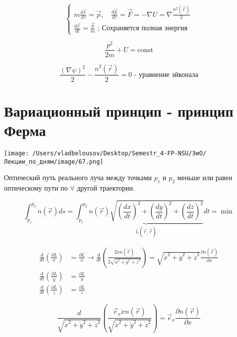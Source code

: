 \documentclass[12pt, a4paper]{report}
\begin{document}
\[ \begin{cases}
    \displaystyle m \frac{d \vec{r } }{d \tau }  = \vec{ p } , \quad  \frac{ d \vec{ p } }{d \tau } =\vec{F } = - \nabla U = \nabla \frac{ n ^2 (\vec{r } )}{2 }  \\
    \displaystyle \frac{ d \vec{r } }{dt } = \frac{ \vec{p } }{m } \text{ ; Сохраняется полная энергия}   
\end{cases} \] 

\[ \frac{ p ^2 }{ 2 m } + U = \mathrm{const}    \]

\[ \frac{(\nabla \psi ) ^2 }{2 } -\frac{ n ^2 (\vec{r } )}{2 } =0 \text{ - уравнение эйконала}   \] 

\section{Вариационный принцип - принцип Ферма} 

\begin{center}
    \texttt{[image: /Users/vladbelousov/Desktop/Semestr\_4-FP-NSU/ЭиО/Лекции\_по\_дням/image/67.png]}
\end{center}

Оптический путь реального луча между точками \( p_1  \) и \( p_2  \) меньше или равен оптическому пути по \( \forall     \) другой траектории.

\[ \int_{ p_1 }^{p_2 } n (\vec{r } )d s = \int_{ p_1 }^{ p_2} \underbrace{ n (\vec{r } ) \sqrt{ \left( \frac{dx}{dt }     \right) ^2 + \left( \frac{dy}{dt }     \right) ^2  +\left( \frac{dz}{dt }     \right) ^2  }}_{\mathbb{L}(\vec{r }  ,\dot{ \vec{r}}  )} dt = \min  \] 

\[ \begin{aligned}
    \frac{d }{dt } \left(  \frac{\partial  L }{\dot{x } }  \right) &=   \frac{\partial  L }{x}  \to \frac{d}{dt } \left(  \frac{ 2 \dot{ x }  n (\vec{r } )}{ 2 \sqrt{\dot{ x } ^2 + \dot{ y } ^2 + \dot{ z } ^2 } }   \right) = \sqrt{\dot{ x } ^2 + \dot{ y } ^2 + \dot{ z } ^2}  \frac{\partial  n ( \vec{r } )}{\partial  x} \\ 
    \frac{d }{dt } \left(  \frac{\partial  L }{\dot{y } }  \right) &=  \frac{\partial  L }{y} \\
    \frac{d }{dt } \left(  \frac{\partial  L }{\dot{z } }  \right) &=   \frac{\partial  L }{z} 
\end{aligned} \] 

\[     \frac{d}{\sqrt{\dot{ x } ^2 + \dot{ y } ^2 + \dot{ z } ^2 }} \left(  \frac{\vec{e } _x \dot{ x }  n(\vec{r } )}{\sqrt{\dot{ x } ^2 + \dot{ y } ^2 + \dot{ z } ^2 }}  \right) = \vec{e } _x \frac{ \partial  n (\vec{r } )}{\partial  x } 
\] 
\end{document}
